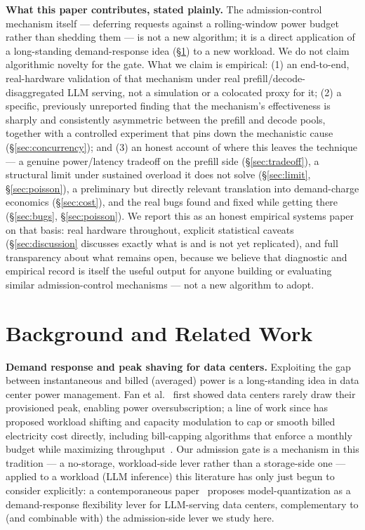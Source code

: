 \documentclass[sigconf,review,anonymous]{acmart}
\begin{document}
\textbf{What this paper contributes, stated plainly.} The admission-control mechanism itself
--- deferring requests against a rolling-window power budget rather than shedding them --- is
not a new algorithm; it is a direct application of a long-standing demand-response idea
(\S\ref{sec:related}) to a new workload. We do not claim algorithmic novelty for the gate.
What we claim is empirical: (1) an end-to-end, real-hardware validation of that mechanism under
real prefill/decode-disaggregated LLM serving, not a simulation or a colocated proxy for it;
(2) a specific, previously unreported finding that the mechanism's effectiveness is sharply and
consistently asymmetric between the prefill and decode pools, together with a controlled
experiment that pins down the mechanistic cause (\S\ref{sec:concurrency}); and (3) an honest
account of where this leaves the technique --- a genuine power/latency tradeoff on the prefill
side (\S\ref{sec:tradeoff}), a structural limit under sustained overload it does not solve
(\S\ref{sec:limit}, \S\ref{sec:poisson}), a preliminary but directly relevant translation into
demand-charge economics (\S\ref{sec:cost}), and the real bugs found and fixed while getting
there (\S\ref{sec:bugs}, \S\ref{sec:poisson}). We report this as an honest empirical systems
paper on that basis: real hardware throughout, explicit statistical caveats
(\S\ref{sec:discussion} discusses exactly what is and is not yet replicated), and full
transparency about what remains open, because we believe that diagnostic and empirical record
is itself the useful output for anyone building or evaluating similar admission-control
mechanisms --- not a new algorithm to adopt.

\section{Background and Related Work}
\label{sec:related}

\textbf{Demand response and peak shaving for data centers.} Exploiting the gap between
instantaneous and billed (averaged) power is a long-standing idea in data center power
management. Fan et al.~\cite{fan2007warehouse} first showed data centers rarely draw their
provisioned peak, enabling power oversubscription; a line of work since has proposed workload
shifting and capacity modulation to cap or smooth billed electricity cost directly, including
bill-capping algorithms that enforce a monthly budget while maximizing
throughput~\cite{zhang2012capping}. Our admission gate is a mechanism in this tradition --- a
no-storage, workload-side lever rather than a storage-side one --- applied to a workload (LLM
inference) this literature has only just begun to consider explicitly: a contemporaneous
paper~\cite{du2026tokens} proposes model-quantization as a demand-response flexibility lever
for LLM-serving data centers, complementary to (and combinable with) the admission-side lever
we study here.
\end{document}
